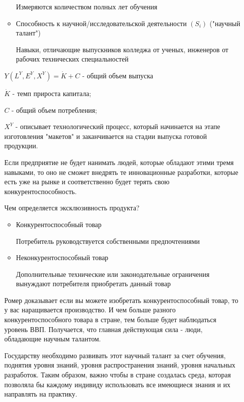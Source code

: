 \documentclass[reqno]{article}
\theoremstyle{definition}
\theoremstyle{definition}
\theoremstyle{definition}
\theoremstyle{definition}
\theoremstyle{definition}
\theoremstyle{definition}
\theoremstyle{definition}
\theoremstyle{definition}
\theoremstyle{definition}
\begin{document}
\begin{itemize}
\begin{itemize}
						\setlength{\leftskip}{2em}
						Измеряются количеством полных лет обучения
						
						\setlength{\leftskip}{0em}
						\item Способность к научной/исследовательской деятельности $(S_i)$ ("научный талант")
						
						\setlength{\leftskip}{2em}
						Навыки, отличающие выпускников колледжа от ученых, инженеров от рабочих технических специальностей
						
					\end{itemize}
					
					$Y(L^Y, E^Y, X^Y) = \dot{K} + C$ - общий объем выпуска
					
					$ \dot{K} $ - темп прироста капитала;
					
					$ C $ - общий объем потребления;
					
					$ X^Y $ - описывает технологический процесс, который начинается на этапе изготовления "макетов" и заканчивается на стадии выпуска готовой продукции.
					
					Если предприятие не будет нанимать людей, которые обладают этими тремя навыками, то оно не сможет внедрять те инновационные разработки, которые есть уже на рынке и соответственно будет терять свою конкурентоспособность.
					
					Чем определяется эксклюзивность продукта?
					
					\begin{itemize}
						\item Конкурентоспособный товар
						
						Потребитель руководствуется собственными предпочтениями
						
						\item Неконкурентоспособный товар
						
						Дополнительные технические или законодательные ограничения вынуждают потребителя приобретать данный товар
					\end{itemize}
					
					Ромер доказывает если вы можете изобретать конкурентоспособный товар, то у вас наращивается производство. И чем больше разного конкурентоспособного товара в стране, тем больше будет наблюдаться уровень ВВП. Получается, что главная действующая сила - люди, обладающие научным талантом.
					
					Государству необходимо развивать этот научный талант за счет обучения, поднятия уровня знаний, уровня распространения знаний, уровня начальных разработок. Таким образом, важно чтобы в стране создалась среда, которая позволяла бы каждому индивиду использовать все имеющиеся знания и их направлять на практику.
					

\end{itemize}
\end{document}
